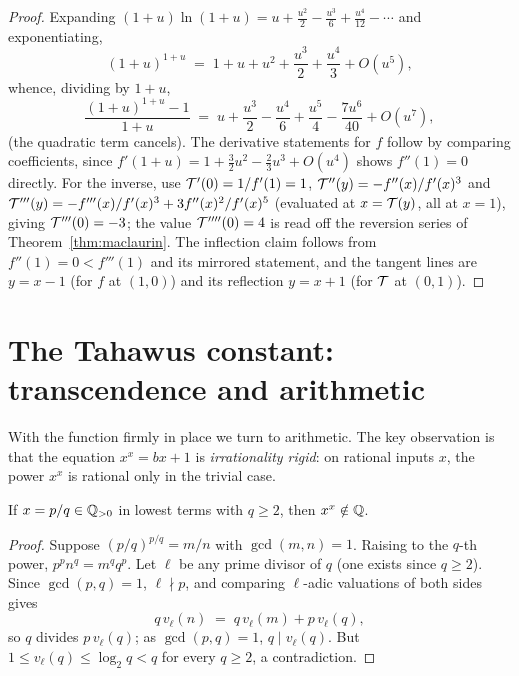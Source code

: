 \begin{proof}
Expanding $(1+u)\ln(1+u) = u + \tfrac{u^{2}}{2} - \tfrac{u^{3}}{6} +
\tfrac{u^{4}}{12} - \cdots$ and exponentiating,
\[
    (1+u)^{1+u} \;=\; 1 + u + u^{2} + \frac{u^{3}}{2} + \frac{u^{4}}{3} +
    O(u^{5}) ,
\]
whence, dividing by $1+u$,
\[
    \frac{(1+u)^{1+u} - 1}{1+u}
    \;=\; u + \frac{u^{3}}{2} - \frac{u^{4}}{6} + \frac{u^{5}}{4} -
    \frac{7u^{6}}{40} + O(u^{7}) ,
\]
(the quadratic term cancels). The derivative statements for $f$ follow
by comparing coefficients, since $f'(1+u) = 1 + \tfrac32 u^{2} -
\tfrac{2}{3}u^{3} + O(u^{4})$ shows $f''(1) = 0$ directly. For the
inverse, use $\mathcal{T}'(0) = 1/f'(1) = 1$,
$\mathcal{T}''(y) = -f''(x)/f'(x)^{3}$ and
$\mathcal{T}'''(y) = -f'''(x)/f'(x)^{3} + 3f''(x)^{2}/f'(x)^{5}$
(evaluated at $x = \mathcal{T}(y)$, all at $x = 1$), giving $\mathcal{T}'''(0) = -3$;
the value $\mathcal{T}''''(0) = 4$ is read off the reversion series of
Theorem~\ref{thm:maclaurin}. The inflection claim follows from
$f''(1) = 0 < f'''(1)$ and its mirrored statement, and the tangent
lines are $y = x - 1$ (for $f$ at $(1,0)$) and its reflection
$y = x + 1$ (for $\mathcal{T}$ at $(0,1)$).
\end{proof}

\section{The Tahawus constant: transcendence and arithmetic}
\label{sec:constant}

With the function firmly in place we turn to arithmetic. The key
observation is that the equation $x^{x} = bx+1$ is \emph{irrationality
rigid}: on rational inputs $x$, the power $x^{x}$ is rational only in
the trivial case.

\begin{lemma}\label{lem:irrational}
If $x = p/q \in \mathbb{Q}_{>0}$ in lowest terms with $q \ge 2$, then
$x^{x} \notin \mathbb{Q}$.
\end{lemma}

\begin{proof}
Suppose $(p/q)^{p/q} = m/n$ with $\gcd(m,n) = 1$. Raising to the
$q$-th power, $p^{p} n^{q} = m^{q} q^{p}$. Let $\ell$ be any prime
divisor of $q$ (one exists since $q \ge 2$). Since $\gcd(p,q) = 1$,
$\ell \nmid p$, and comparing $\ell$-adic valuations of both sides gives
\[
    q\, v_\ell(n) \;=\; q\, v_\ell(m) + p\, v_\ell(q),
\]
so $q$ divides $p\,v_\ell(q)$; as $\gcd(p,q)=1$, $q \mid
v_\ell(q)$. But $1 \le v_\ell(q) \le \log_{2} q < q$ for every $q \ge 2$,
a contradiction.
\end{proof}

